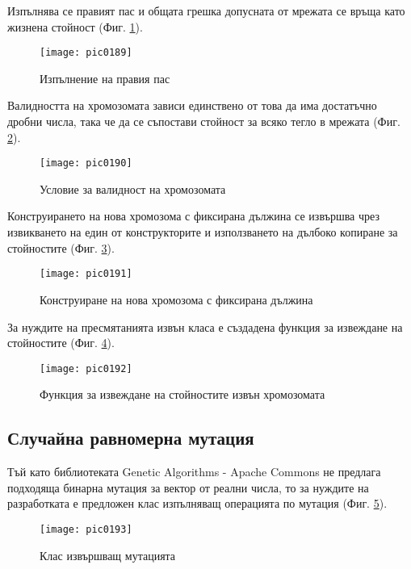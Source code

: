 Изпълнява се правият пас и общата грешка допусната от мрежата се връща като жизнена стойност (Фиг. \ref{fig:pic0189}).

\begin{figure}[h]
  \centering
  \texttt{[image: pic0189]}
  \caption{Изпълнение на правия пас}
\label{fig:pic0189}
\end{figure}
\FloatBarrier

Валидността на хромозомата зависи единствено от това да има достатъчно дробни числа, така че да се съпостави стойност за всяко тегло в мрежата (Фиг. \ref{fig:pic0190}).

\begin{figure}[h]
  \centering
  \texttt{[image: pic0190]}
  \caption{Условие за валидност на хромозомата}
\label{fig:pic0190}
\end{figure}
\FloatBarrier

Конструирането на нова хромозома с фиксирана дължина се извършва чрез извикването на един от конструкторите и използването на дълбоко копиране за стойностите (Фиг. \ref{fig:pic0191}).

\begin{figure}[h]
  \centering
  \texttt{[image: pic0191]}
  \caption{Конструиране на нова хромозома с фиксирана дължина}
\label{fig:pic0191}
\end{figure}
\FloatBarrier

За нуждите на пресмятанията извън класа е създадена функция за извеждане на стойностите (Фиг. \ref{fig:pic0192}).

\begin{figure}[h]
  \centering
  \texttt{[image: pic0192]}
  \caption{Функция за извеждане на стойностите извън хромозомата}
\label{fig:pic0192}
\end{figure}
\FloatBarrier

\subsection{Случайна равномерна мутация}

Тъй като библиотеката Genetic Algorithms - Apache Commons не предлага подходяща бинарна мутация за вектор от реални числа, то за нуждите на разработката е предложен клас изпълняващ операцията по мутация (Фиг. \ref{fig:pic0193}).

\begin{figure}[h]
  \centering
  \texttt{[image: pic0193]}
  \caption{Клас извършващ мутацията}
\label{fig:pic0193}
\end{figure}
\FloatBarrier

